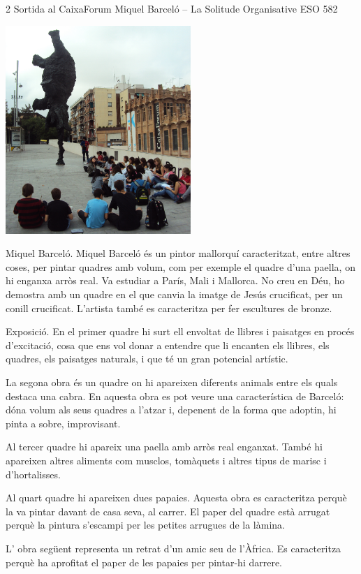 \begin{news}
{2} %
{Sortida al CaixaForum}
{Miquel Barceló – La Solitude Organisative}
{ESO}
{582} %


\noindent\includegraphics[width=7cm,keepaspectratio]{eso/img/barcelo_2.jpg}

Miquel Barceló.
Miquel Barceló és un pintor mallorquí caracteritzat, entre altres coses, per pintar quadres amb volum, com per exemple el quadre d'una paella, on hi enganxa arròs real. Va estudiar a París, Mali i Mallorca. No creu en Déu, ho demostra amb un quadre en el que canvia la imatge de Jesús crucificat, per un conill crucificat. L’artista també es caracteritza per fer escultures de bronze.

Exposició.
En el primer quadre hi surt ell envoltat de llibres i paisatges en procés d'excitació, cosa que ens vol donar a entendre que li encanten els llibres, els quadres, els paisatges naturals, i que té un gran potencial artístic.

La segona obra és un quadre on hi apareixen diferents animals entre els quals destaca una cabra. En aquesta obra es pot veure una característica de Barceló: dóna volum als seus quadres a l’atzar i, depenent de la forma que adoptin, hi pinta a sobre, improvisant.

Al tercer quadre hi apareix una paella amb arròs real enganxat. També hi apareixen altres aliments com musclos, tomàquets i altres tipus de marisc i d’hortalisses. 

Al quart quadre hi apareixen dues papaies. Aquesta obra es caracteritza perquè la va pintar davant de casa seva, al carrer. El paper del quadre està arrugat perquè la pintura s’escampi per les petites arrugues de la làmina.

L’ obra següent representa un retrat d’un amic seu de l’Àfrica. Es caracteritza perquè ha aprofitat el paper de les papaies per pintar-hi darrere.
 

\end{news}
